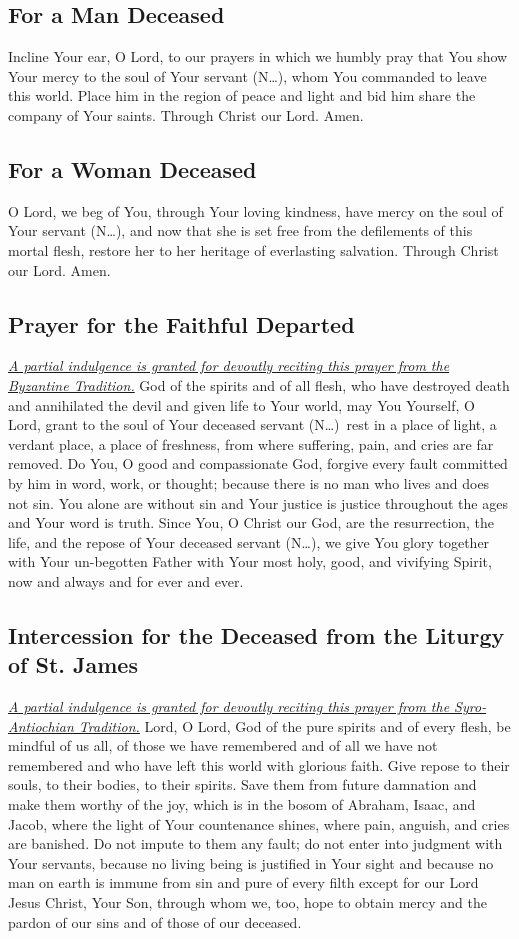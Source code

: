 \documentclass[12pt]{article}
\newcommand{\prayertitle}[1]{\subsection{#1}}
\newcommand{\indulgencedprayertitle}[1]{\prayertitle{#1 \protect\kreuz}}
\newcommand{\insertname}{(N\dots)}
\newcommand{\note}[1]{{\small{\textsl{#1}}}\newline}
\newcommand{\linkednote}[2]{\hyperlink{#1}{\note{#2}}}
\begin{document}
\prayertitle{For a Man Deceased}
Incline Your ear, O Lord, to our prayers in which we humbly pray that You show Your mercy to the soul of Your servant \insertname, whom You commanded to leave this world.
Place him in the region of peace and light and bid him share the company of Your saints.
Through Christ our Lord. Amen.

\prayertitle{For a Woman Deceased}
O Lord, we beg of You, through Your loving kindness, have mercy on the soul of Your servant \insertname, and now that she is set free from the defilements of this mortal flesh, restore her to her heritage of everlasting salvation.
Through Christ our Lord. Amen.

\indulgencedprayertitle{Prayer for the Faithful Departed}
\linkednote{grant23}{A partial indulgence is granted for devoutly reciting this prayer from the Byzantine Tradition.}
God of the spirits and of all flesh, who have destroyed death and annihilated the devil
and given life to Your world, may You Yourself, O Lord, grant to the soul of Your
deceased servant \insertname\ rest in a place of light, a verdant place, a place of freshness, from where suffering, pain, and cries are far removed.
Do You, O good and compassionate God, forgive every fault committed by him in word, work, or thought;
because there is no man who lives and does not sin.
You alone are without sin and Your justice is justice throughout the ages and Your word is truth.
Since You, O Christ our God, are the resurrection, the life, and the repose of Your
deceased servant \insertname, we give You glory together with Your un-begotten Father with
Your most holy, good, and vivifying Spirit, now and always and for ever and ever.

\indulgencedprayertitle{Intercession for the Deceased from the Liturgy of St. James}
\linkednote{grant23}{A partial indulgence is granted for devoutly reciting this prayer from the Syro-Antiochian Tradition.}
Lord, O Lord, God of the pure spirits and of every flesh, be mindful of us all, of those we have remembered and of all we have not remembered and who have left this world with glorious faith.
Give repose to their souls, to their bodies, to their spirits.
Save them from future damnation and make them worthy of the joy, which is in the bosom of Abraham, Isaac, and Jacob, where the light of Your countenance shines, where pain, anguish, and cries are banished.
Do not impute to them any fault;
do not enter into judgment with Your servants, because no living being is justified in Your sight and because no man on earth is immune from sin and pure of every filth except for our Lord Jesus Christ, Your Son, through whom we, too, hope to obtain mercy and the pardon of our sins and of those of our deceased.
\end{document}
